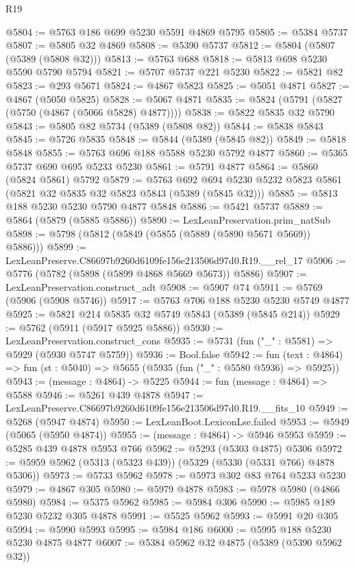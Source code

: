 \begin{lexlean}{R19}
\begin{coremodule}
@5804 := @5763 @186 @699 @5230 @5591 @4869 @5795
@5805 := @5384 @5737
@5807 := @5805 @32 @4869
@5808 := @5390 @5737
@5812 := @5804 (@5807 (@5389 (@5808 @32)))
@5813 := @5763 @688
@5818 := @5813 @698 @5230 @5590 @5790 @5794
@5821 := @5707 @5737 @221 @5230
@5822 := @5821 @82
@5823 := @293 @5671
@5824 := @4867 @5823
@5825 := @5051 @4871
@5827 := @4867 (@5050 @5825)
@5828 := @5067 @4871
@5835 := @5824 (@5791 (@5827 (@5750 (@4867 (@5066 @5828) @4877))))
@5838 := @5822 @5835 @32 @5790
@5843 := @5805 @82 @5734 (@5389 (@5808 @82))
@5844 := @5838 @5843
@5845 := @5726 @5835
@5848 := @5844 (@5389 (@5845 @82))
@5849 := @5818 @5848
@5855 := @5763 @696 @188 @5588 @5230 @5792 @4877
@5860 := @5365 @5737 @690 @695 @5233 @5230
@5861 := @5791 @4877
@5864 := @5860 (@5824 @5861) @5792
@5879 := @5763
    @692
    @694
    @5230
    @5232
    @5823
    @5861
    (@5821 @32 @5835 @32 @5823 @5843 (@5389 (@5845 @32)))
@5885 := @5813 @188 @5230 @5230 @5790 @4877 @5848
@5886 := @5421 @5737
@5889 := @5864 (@5879 (@5885 @5886))
@5890 := LexLeanPreservation.prim_natSub
@5898 := @5798 (@5812 (@5849 (@5855 (@5889 (@5890 @5671 @5669)) @5886)))
@5899 := LexLeanPreserve.C86697b9260d6109fe156e213506d97d0.R19.__rel_17
@5906 := @5776 (@5782 (@5898 (@5899 @4868 @5669 @5673)) @5886)
@5907 := LexLeanPreservation.construct_adt
@5908 := @5907 @74
@5911 := @5769 (@5906 (@5908 @5746))
@5917 := @5763 @706 @188 @5230 @5230 @5749 @4877
@5925 := @5821 @214 @5835 @32 @5749 @5843 (@5389 (@5845 @214))
@5929 := @5762 (@5911 (@5917 @5925 @5886))
@5930 := LexLeanPreservation.construct_cons
@5935 := @5731 (fun ("_" : @5581) => @5929 (@5930 @5747 @5759))
@5936 := Bool.false
@5942 := fun (text : @4864) => fun (st : @5040) => @5655 (@5935 (fun ("_" : @5580 @5936) => @5925))
@5943 := (message : @4864) -> @5225
@5944 := fun (message : @4864) => @5588
@5946 := @5261 @439 @4878
@5947 := LexLeanPreserve.C86697b9260d6109fe156e213506d97d0.R19.__fits_10
@5949 := @5268 (@5947 @4874)
@5950 := LexLeanBoot.LexiconLse.failed
@5953 := @5949 (@5065 (@5950 @4874))
@5955 := (message : @4864) -> @5946 @5953
@5959 := @5285 @439 @4878 @5953 @766
@5962 := @5293 (@5303 @4875) @5306
@5972 := @5959 @5962 (@5313 (@5323 @439)) (@5329 (@5330 (@5331 @766) @4878 @5306))
@5973 := @5733 @5962
@5978 := @5973 @302 @83 @764 @5233 @5230
@5979 := @4867 @305
@5980 := @5979 @4878
@5983 := @5978 @5980 (@4866 @5980)
@5984 := @5375 @5962
@5985 := @5984 @306
@5990 := @5985 @189 @5230 @5232 @305 @4878
@5991 := @5525 @5962
@5993 := @5991 @20 @305
@5994 := @5990 @5993
@5995 := @5984 @186
@6000 := @5995 @188 @5230 @5230 @4875 @4877
@6007 := @5384 @5962 @32 @4875 (@5389 (@5390 @5962 @32))

\end{coremodule}
\end{lexlean}

